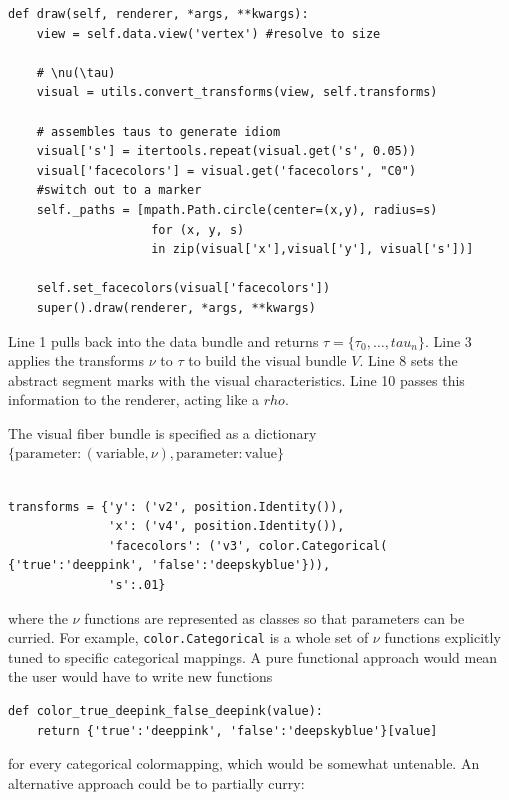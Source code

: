 \documentclass[../main.tex]{subfiles}
\begin{document}
\begin{verbatim}
def draw(self, renderer, *args, **kwargs):
    view = self.data.view('vertex') #resolve to size
    
    # \nu(\tau)
    visual = utils.convert_transforms(view, self.transforms)
        
    # assembles taus to generate idiom
    visual['s'] = itertools.repeat(visual.get('s', 0.05))
    visual['facecolors'] = visual.get('facecolors', "C0")
    #switch out to a marker 
    self._paths = [mpath.Path.circle(center=(x,y), radius=s)  
                    for (x, y, s) 
                    in zip(visual['x'],visual['y'], visual['s'])] 
    
    self.set_facecolors(visual['facecolors'])
    super().draw(renderer, *args, **kwargs)
\end{verbatim}
Line 1 pulls back into the data bundle and returns $\tau = \{\tau_0, \ldots, tau_{n}\}$. Line 3 applies the transforms $\nu$ to $\tau$ to build the visual bundle $V$.  Line 8 sets the abstract segment marks with the visual characteristics. Line 10 passes this information to the renderer, acting like a $rho$. 

The visual fiber bundle is specified as a dictionary $\{\mbox{parameter}: (\mbox{variable}, \nu), \mbox{parameter}:\mbox{value}\}$ 
\begin{verbatim}

transforms = {'y': ('v2', position.Identity()),       
              'x': ('v4', position.Identity()),
              'facecolors': ('v3', color.Categorical( {'true':'deeppink', 'false':'deepskyblue'})), 
              's':.01}
\end{verbatim}

where the $\nu$ functions are represented as classes so that parameters can be curried. For example, \texttt{color.Categorical} is a whole set of $\nu$ functions explicitly tuned to specific categorical mappings. A pure functional approach would mean the user would have to write new functions

\begin{verbatim}
def color_true_deepink_false_deepink(value):
    return {'true':'deeppink', 'false':'deepskyblue'}[value]

\end{verbatim}

for every categorical colormapping, which would be somewhat untenable. An alternative approach could be to partially curry:
\end{document}
